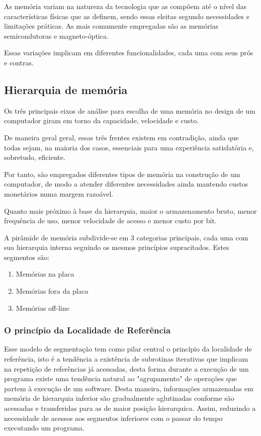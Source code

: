 \documentclass[12pt]{elsarticle}
\begin{document}
As memória variam na natureza da tecnologia que as compõem até o nível das características físicas que as definem, sendo essas eleitas segundo necessidades e limitações práticas. As mais comumente empregadas são as memórias semicondutoras e magneto-óptica.

Essas variações implicam em diferentes funcionalidades, cada uma com seus prós e contras.

\subsection{Hierarquia de memória}
Os três principais eixos de análise para escolha de uma memória no design de um computador giram em torno da capacidade, velocidade e custo.

De maneira geral geral, essas três frentes existem em contradição, ainda que todas sejam, na maioria dos casos, essenciais para uma experiência satisfatória e, sobretudo, eficiente.

Por tanto, são empregados diferentes tipos de memória na construção de um computador, de modo a atender diferentes necessidades ainda mantendo custos monetários numa margem razoável. 

Quanto mais próximo à base da hierarquia, maior o armazenamento bruto, menor frequência de uso, menor velocidade de acesso e menor custo por bit.

A pirâmide de memória subdivide-se em 3 categorias principais, cada uma com sua hierarquia interna seguindo os mesmos princípios supracitados. Estes segmentos são:
\begin{enumerate}
    \item Memórias na placa
    \item Memórias fora da placa
    \item Memórias off-line
\end{enumerate}

\subsubsection{O princípio da Localidade de Referência}
Esse modelo de segmentação tem como pilar central o princípio da localidade de referência, isto é a tendência a existência de subrotinas iterativas que implicam na repetição de referências já acessadas, desta forma durante a execução de um programa existe uma tendência natural ao "agrupamento" de operações que partem à execução de um software. Desta maneira, informações armazenadas em memória de hierarquia inferior são gradualmente aglutinadas conforme são acessadas e transferidas para as de maior posição hierarquica. Assim, reduzindo a necessidade de acessos aos segmentos inferiores com o passar do tempo executando um programa.
\end{document}

